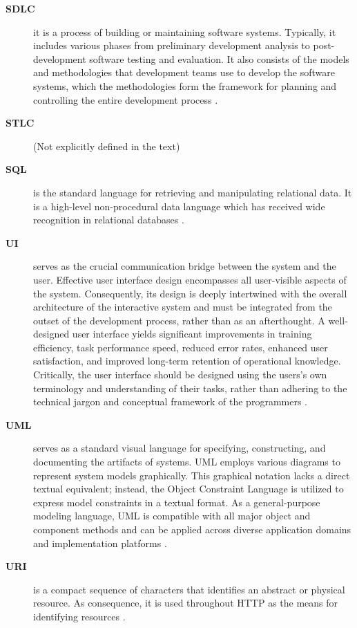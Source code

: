 \begin{description}
\item[\textbf{SDLC}] it is a process of building or maintaining software systems. Typically, it includes various phases from preliminary development analysis to post-development software testing and evaluation. It also consists of the models and methodologies that development teams use to develop the software systems, which the methodologies form the framework for planning and controlling the entire development process \cite{leau2012software}.

\item[\textbf{STLC}] 
    (Not explicitly defined in the text)

\item[\textbf{SQL}] is the standard language for retrieving and manipulating relational data.  It is a high-level non-procedural data language which has received wide recognition in relational databases \cite{blacher2022machine, kim1982optimizing}. 

\item[\textbf{UI}] serves as the crucial communication bridge between the system and the user. Effective user interface design encompasses all user-visible aspects of the system. Consequently, its design is deeply intertwined with the overall architecture of the interactive system and must be integrated from the outset of the development process, rather than as an afterthought. A well-designed user interface yields significant improvements in training efficiency, task performance speed, reduced error rates, enhanced user satisfaction, and improved long-term retention of operational knowledge. Critically, the user interface should be designed using the users's own terminology and understanding of their tasks, rather than adhering to the technical jargon and conceptual framework of the programmers \cite{jacob2003}.

\item[\textbf{UML}] serves as a standard visual language for specifying, constructing, and documenting the artifacts of systems. UML employs various diagrams to represent system models graphically. This graphical notation lacks a direct textual equivalent; instead, the Object Constraint Language is utilized to express model constraints in a textual format. As a general-purpose modeling language, UML is compatible with all major object and component methods and can be applied across diverse application domains and implementation platforms \cite{garcia2004uml, he2006comparison}.

\item[\textbf{URI}] is a compact sequence of characters that identifies an abstract or physical resource. As consequence, it is used throughout HTTP as the means for identifying resources \cite{rfc3986, rfc9110}.


\end{description}
